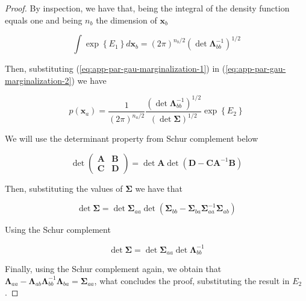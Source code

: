 \begin{appendices}
\begin{proof}
    By inspection, we have that, being the integral of the density function equals one and being $n_b$ the dimension of $\mathbf{x}_b$

    \begin{equation}
      \label{eq:app-par-gau-marginalization-2}
      \int \exp \left\{ E_1 \right\} d \mathbf{x}_b = \left( 2 \pi \right)^{n_b/2} \left( \det \mathbf{\Lambda}_{bb}^{-1} \right) ^{1 / 2}
    \end{equation}

    Then, substituting (\ref{eq:app-par-gau-marginalization-1}) in (\ref{eq:app-par-gau-marginalization-2}) we have

    \begin{equation*}
      p\left(\mathbf{x}_{a}\right)=\frac{1}{(2 \pi)^{n_a / 2}} \frac{\left( \det \mathbf{\Lambda}_{bb}^{-1} \right) ^{1 / 2}}{ \left( \det \mathbf{\Sigma} \right) ^{1 / 2}} \exp \left\{ E_2 \right\}
    \end{equation*}

    We will use the determinant property from Schur complement below

    \begin{equation}
    \label{eq:app-det-schur-complement}
    \det \left(\begin{array}{cc}{\mathbf{A}} & \mathbf{B} \\ \mathbf{C} & \mathbf{D} \end{array}\right)=\det \mathbf{A} \det \left(\mathbf{D}-\mathbf{C A}^{-1} \mathbf{B}\right)
    \end{equation}

    Then, substituting the values of $\boldsymbol{\Sigma}$ we have that

    \begin{equation}
      \det \boldsymbol{\Sigma}=\det \boldsymbol{\Sigma}_{a a} \det\left(\boldsymbol{\Sigma}_{b b}-\boldsymbol{\Sigma}_{b a} \boldsymbol{\Sigma}_{a a}^{-1} \boldsymbol{\Sigma}_{a b}\right)
    \end{equation}

    Using the Schur complement

    \begin{equation}
      \det \boldsymbol{\Sigma}=\det \boldsymbol{\Sigma}_{a a} \det \boldsymbol{\Lambda}_{bb}^{-1}
    \end{equation}

    Finally, using the Schur complement again, we obtain that $\boldsymbol{\Lambda}_{a a}-\boldsymbol{\Lambda}_{a b} \boldsymbol{\Lambda}_{b b}^{-1} \boldsymbol{\Lambda}_{b a} = \boldsymbol{\Sigma}_{a a}$, what concludes the proof, substituting the result in $E_2$.
  \end{proof}


\end{appendices}

